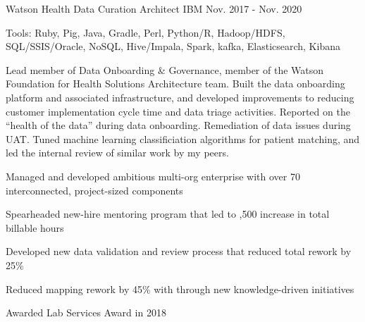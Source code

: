 \begin{cventries}
  \cvexpentry
    {Watson Health} %
    {Data Curation Architect} %
    {IBM}
    {Nov. 2017 - Nov. 2020}
    {
      \begin{cvheavyparagraph}
        Tools: Ruby, Pig, Java, Gradle, Perl, Python/R, Hadoop/HDFS, SQL/SSIS/Oracle, NoSQL, Hive/Impala, Spark, kafka, Elasticsearch, Kibana
      \end{cvheavyparagraph}
    }
    {
      \begin{cvparagraph}
        Lead member of Data Onboarding \& Governance, member of the Watson Foundation for Health Solutions Architecture team.  Built the data onboarding platform and associated infrastructure, and developed improvements to reducing customer implementation cycle time and data triage activities.  Reported on the “health of the data” during data onboarding.  Remediation of data issues during UAT.  Tuned machine learning classificiation algorithms for patient matching, and led the internal review of similar work by my peers.
      \end{cvparagraph}
      \begin{cvitems} %
        \item {Managed and developed ambitious multi-org enterprise with over 70 interconnected, project-sized components}
        \item {Spearheaded new-hire mentoring program that led to ,500 increase in total billable hours}
        \item {Developed new data validation and review process that reduced total rework by 25\%}
        \item {Reduced mapping rework by 45\% with through new knowledge-driven initiatives}
        \item {Awarded Lab Services Award in 2018}
      \end{cvitems}
    }


\end{cventries}
